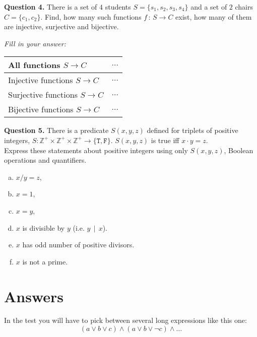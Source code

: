 \documentclass[jou]{apa6}
\begin{document}
\vspace{10pt}
{\bf Question 4.} There is a set of $4$ students $S = \{ s_1, s_2, s_3, s_4 \}$ and 
a set of $2$ chairs $C = \{ c_1, c_2 \}$. 
Find, how many such functions $f\,:\,S \rightarrow C$ exist, 
how many of them are injective, surjective and bijective.

{\em Fill in your answer:}

\begin{tabular}{ll} \hline
All functions $S \rightarrow C$ & $\ldots$ \\ \hline
Injective functions $S \rightarrow C$ & $\ldots$ \\ \hline
Surjective functions $S \rightarrow C$ & $\ldots$ \\ \hline
Bijective functions $S \rightarrow C$ & $\ldots$ \\\hline
\end{tabular}



\vspace{10pt}
{\bf Question 5.}
There is a predicate $S(x, y, z)$ defined for triplets
of positive integers, 
$S: \mathbb{Z}^{+} \times \mathbb{Z}^{+} \times \mathbb{Z}^{+} \rightarrow \{ \mathtt{T}, \mathtt{F} \}$. 
$S(x,y,z)$ is true iff $x \cdot y = z$.\\
Express these statements about positive integers
using only $S(x,y,z)$, Boolean operations and quantifiers. 

\begin{enumerate}[(a)] 
\item $x/y = z$,
\item $x = 1$,
\item $x = y$, 
\item $x$ is divisible by $y$ (i.e. $y \,\mid\, x$). 
\item $x$ has odd number of positive divisors.
\item $x$ is not a prime. 
\end{enumerate}


\section{Answers}

\noindent
In the test you will have to pick between several long expressions like this one:
$$(a \vee b \vee c) \wedge (a \vee b \vee \neg c) \wedge \ldots$$
\end{document}
